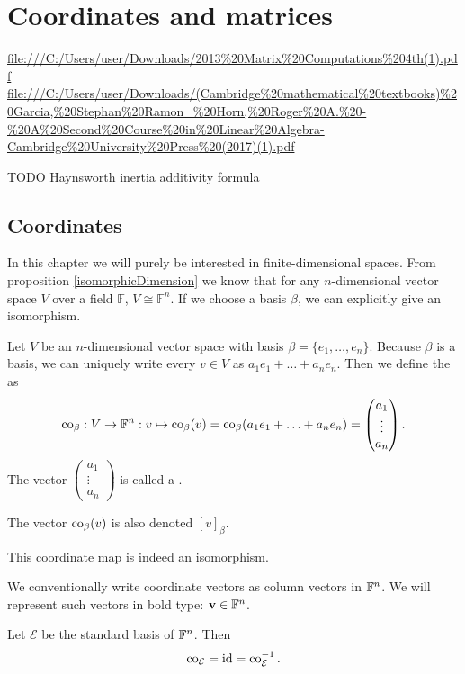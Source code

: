 \chapter{Coordinates and matrices}

\url{file:///C:/Users/user/Downloads/2013%20Matrix%20Computations%204th(1).pdf}
\url{file:///C:/Users/user/Downloads/(Cambridge%20mathematical%20textbooks)%20Garcia,%20Stephan%20Ramon_%20Horn,%20Roger%20A.%20-%20A%20Second%20Course%20in%20Linear%20Algebra-Cambridge%20University%20Press%20(2017)(1).pdf}

TODO Haynsworth inertia additivity formula

\section{Coordinates}
In this chapter we will purely be interested in finite-dimensional spaces. From proposition \ref{isomorphicDimension} we know that for any $n$-dimensional vector space $V$ over a field $\mathbb{F}$, $V\cong \mathbb{F}^n$. If we choose a basis $\beta$, we can explicitly give an isomorphism.
\begin{definition}
Let $V$ be an $n$-dimensional vector space with basis $\beta = \{e_1,\ldots, e_n\}$. Because $\beta$ is a basis, we can uniquely write every $v\in V$ as $a_1e_1+\ldots +a_ne_n$. Then we define the  as
\[ \operatorname{co}_\beta: V \to \mathbb{F}^n: v \mapsto \operatorname{co}_\beta(v) = \operatorname{co}_\beta(a_1e_1+\ldots +a_ne_n) = \begin{pmatrix}
a_1 \\ \vdots \\ a_n
\end{pmatrix}. \]
The vector $\begin{pmatrix}
a_1 \\ \vdots \\ a_n
\end{pmatrix}$ is called a .

The vector $\operatorname{co}_\beta(v)$ is also denoted $[v]_\beta$.
\end{definition}
This coordinate map is indeed an isomorphism.

We conventionally write coordinate vectors as column vectors in $\mathbb{F}^n$. We will represent such vectors in bold type: $\boldsymbol{\mathrm{v}}\in\mathbb{F}^n$.

\begin{lemma}
Let $\mathcal{E}$ be the standard basis of $\mathbb{F}^n$. Then
\[ \operatorname{co}_\mathcal{E} = \operatorname{id} = \operatorname{co}_\mathcal{E}^{-1}. \]
\end{lemma}


